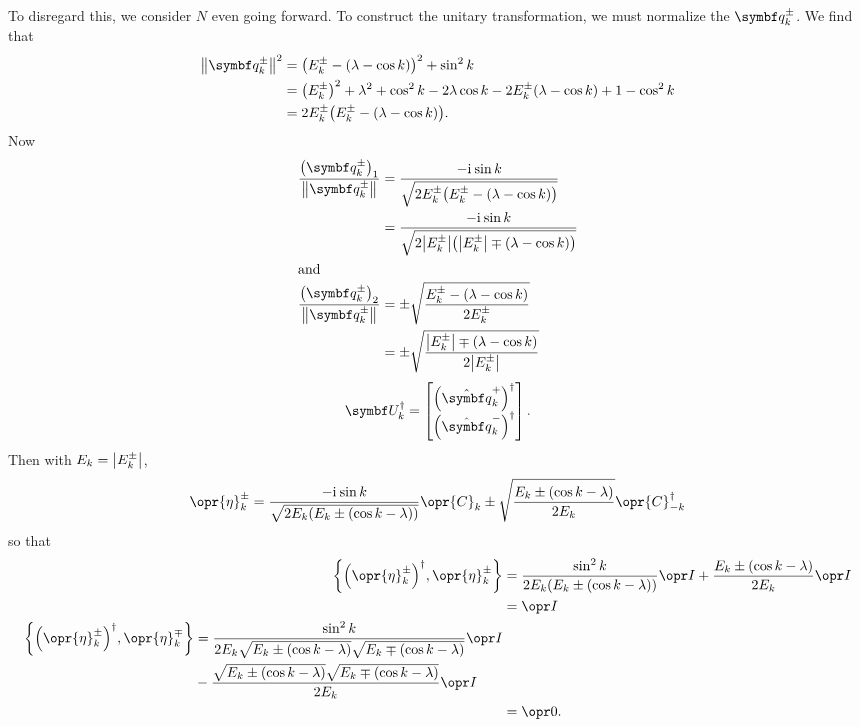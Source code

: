 \documentclass[../thesis.tex]{subfiles}
\begin{document}
To disregard this, we consider $N$ even going forward. To construct the unitary
transformation, we must normalize the $\vq{q}_k^\pm$. We find that
\begin{align}
  \norm{\vq{q}_k^\pm}^2
  &= {\qty(E_k^\pm - (\lambda - \cos k))}^2 + \sin^2 k \\
  &= {\qty(E_k^\pm)}^2 + \lambda^2 + \cos^2 k - 2\lambda\cos k - 2E_k^\pm(\lambda - \cos k) + 1 - \cos^2 k \\
  &= 2E_k^\pm \qty(E_k^\pm - (\lambda - \cos k)).
\end{align}
Now
\begin{align}
  \frac{{\qty(\vq{q}_k^\pm)}_1}{\norm{\vq{q}_k^\pm}}
  &= \frac{-\im\sin k}{\sqrt{2E_k^\pm \qty(E_k^\pm - (\lambda - \cos k))}} \\
  &= \frac{-\im\sin k}{\sqrt{2\abs{E_k^\pm} \qty(\abs{E_k^\pm} \mp (\lambda - \cos k))}}
  \\
  \shortintertext{and}
  \frac{{\qty(\vq{q}_k^\pm)}_2}{\norm{\vq{q}_k^\pm}}
  &= \pm\sqrt{\frac{E_k^\pm - (\lambda - \cos k)}{2E_k^\pm}} \\
  &= \pm\sqrt{\frac{\abs{E_k^\pm} \mp (\lambda - \cos k)}{2\abs{E_k^\pm}}}
\end{align}
\begin{equation}
  \mq{U}_k^\dag
  = \bmqty{%
    {\qty(\hat{\vq{q}}_k^+)}^\dag \\
    {\qty(\hat{\vq{q}}_k^-)}^\dag
  }.
\end{equation}
Then with $E_k = \abs{E_k^\pm}$,
\begin{equation}
  \opr{\eta}_k^\pm
  = \frac{-\im\sin k}{\sqrt{2E_k\qty(E_k \pm (\cos k - \lambda))}}
  \opr{C}_k
  \pm \sqrt{\frac{E_k \pm (\cos k - \lambda)}{2E_k}}
  \opr{C}^\dag_{-k}
  \label{eq:etas}
\end{equation}
so that
\begin{align}
  \acomm{{\qty(\opr{\eta}_k^\pm)}^\dag}{\opr{\eta}_k^\pm}
  &= \frac{\sin^2 k}{2E_k\qty(E_k \pm (\cos k - \lambda))} \idopr
  + \frac{E_k \pm (\cos k - \lambda)}{2E_k} \idopr \\
  &= \idopr
  \\
  \begin{split}
  \acomm{{\qty(\opr{\eta}_k^\pm)}^\dag}{\opr{\eta}_k^\mp}
  &= \frac{\sin^2 k}{2E_k
    \sqrt{E_k \pm (\cos k - \lambda)}
  \sqrt{E_k \mp (\cos k - \lambda)}} \idopr \\
  &- \frac{\sqrt{E_k \pm (\cos k - \lambda)}\sqrt{E_k \mp (\cos k - \lambda)}}{%
  2 E_k} \idopr
  \end{split}
  \\
  &= \zopr.
\end{align}
\end{document}
